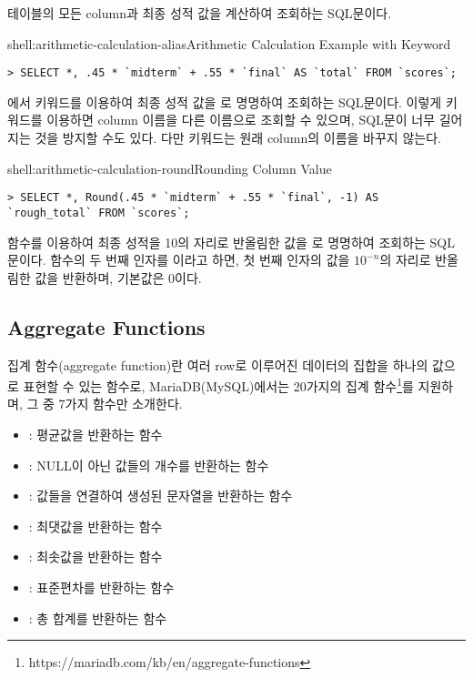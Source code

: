 \은  테이블의 모든 column과 최종 성적 값을 계산하여 조회하는 SQL문이다.

\begin{shell}{shell:arithmetic-calculation-alias}{Arithmetic Calculation Example with  Keyword}
\begin{verbatim}
> SELECT *, .45 * `midterm` + .55 * `final` AS `total` FROM `scores`;
\end{verbatim}
\end{shell}

\은 에서  키워드를 이용하여 최종 성적 값을 로 명명하여 조회하는 SQL문이다. 이렇게  키워드를 이용하면 column 이름을 다른 이름으로 조회할 수 있으며, SQL문이 너무 길어지는 것을 방지할 수도 있다. 다만  키워드는 원래 column의 이름을 바꾸지 않는다.

\begin{shell}{shell:arithmetic-calculation-round}{Rounding Column Value}
\begin{verbatim}
> SELECT *, Round(.45 * `midterm` + .55 * `final`, -1) AS `rough_total` FROM `scores`;
\end{verbatim}
\end{shell}

\는  함수를 이용하여 최종 성적을 10의 자리로 반올림한 값을 로 명명하여 조회하는 SQL문이다.  함수의 두 번째 인자를 이라고 하면, 첫 번째 인자의 값을 $10^{-n}$의 자리로 반올림한 값을 반환하며, 기본값은 0이다.

\subsection*{Aggregate Functions}

집계 함수(aggregate function)란 여러 row로 이루어진 데이터의 집합을 하나의 값으로 표현할 수 있는 함수로, MariaDB(MySQL)에서는 20가지의 집계 함수\footnote{https://mariadb.com/kb/en/aggregate-functions}를 지원하며, 그 중 7가지 함수만 소개한다.

\begin{itemize}
    \item {}: 평균값을 반환하는 함수
    \item {}: NULL이 아닌 값들의 개수를 반환하는 함수
    \item {}: 값들을 연결하여 생성된 문자열을 반환하는 함수
    \item {}: 최댓값을 반환하는 함수
    \item {}: 최솟값을 반환하는 함수
    \item {}: 표준편차를 반환하는 함수
    \item {}: 총 합계를 반환하는 함수
\end{itemize}

